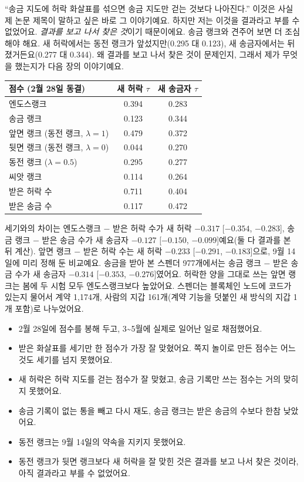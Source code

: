 “송금 지도에 허락 화살표를 섞으면 송금 지도만 걷는 것보다 나아진다.”
이것은 사실 제 논문 제목이 말하고 싶은 바로 그 이야기예요.
하지만 저는 이것을 결과라고 부를 수 없었어요.
\emph{결과를 보고 나서 찾은 것}이기 때문이에요.
송금 랭크와 견주어 보면 더 조심해야 해요.
새 허락에서는 동전 랭크가 앞섰지만(0.295 대 0.123), 새 송금자에서는 뒤졌거든요(0.277 대 0.344).
왜 결과를 보고 나서 찾은 것이 문제인지, 그래서 제가 무엇을 했는지가 다음 장의 이야기예요.

\begin{deeper}[진짜 숫자]
\begin{center}
\small
\begin{tabular}{@{}lcc@{}}
\toprule
점수 (2월 28일 동결) & 새 허락 $\tau$ & 새 송금자 $\tau$ \\
\midrule
엔도스랭크 & 0.394 & 0.283 \\
송금 랭크 & 0.123 & 0.344 \\
앞면 랭크 (동전 랭크, $\lambda=1$) & 0.479 & 0.372 \\
뒷면 랭크 (동전 랭크, $\lambda=0$) & 0.044 & 0.270 \\
동전 랭크 ($\lambda=0.5$) & 0.295 & 0.277 \\
씨앗 랭크 & 0.114 & 0.264 \\
받은 허락 수 & 0.711 & 0.404 \\
받은 송금 수 & 0.117 & 0.472 \\
\bottomrule
\end{tabular}
\end{center}
세기와의 차이는 엔도스랭크 $-$ 받은 허락 수가 새 허락 $-0.317$ [$-0.354$, $-0.283$], 송금 랭크 $-$ 받은 송금 수가 새 송금자 $-0.127$ [$-0.150$, $-0.099$]예요(둘 다 결과를 본 뒤 계산).
앞면 랭크 $-$ 받은 허락 수는 새 허락 $-0.233$ [$-0.291$, $-0.183$]으로, 9월 14일에 미리 정해 둔 비교예요.
송금을 받아 본 스펜더 977개에서는 송금 랭크 $-$ 받은 송금 수가 새 송금자 $-0.314$ [$-0.353$, $-0.276$]였어요.
허락한 양을 그대로 쓰는 앞면 랭크는 봄에 두 시험 모두 엔도스랭크보다 높았어요.
스펜더는 블록체인 노드에 코드가 있는지 물어서 계약 1,174개, 사람의 지갑 161개(계약 기능을 덧붙인 새 방식의 지갑 1개 포함)로 나누었어요.
\end{deeper}

\begin{learned}
\begin{itemize}
\item 2월 28일에 점수를 봉해 두고, 3\textasciitilde{}5월에 실제로 일어난 일로 채점했어요.
\item 받은 화살표를 세기만 한 점수가 가장 잘 맞혔어요. 쪽지 놀이로 만든 점수는 어느 것도 세기를 넘지 못했어요.
\item 새 허락은 허락 지도를 걷는 점수가 잘 맞혔고, 송금 기록만 쓰는 점수는 거의 맞히지 못했어요.
\item 송금 기록이 없는 통을 빼고 다시 재도, 송금 랭크는 받은 송금의 수보다 한참 낮았어요.
\item 동전 랭크는 9월 14일의 약속을 지키지 못했어요.
\item 동전 랭크가 뒷면 랭크보다 새 허락을 잘 맞힌 것은 결과를 보고 나서 찾은 것이라, 아직 결과라고 부를 수 없었어요.
\end{itemize}
\end{learned}
